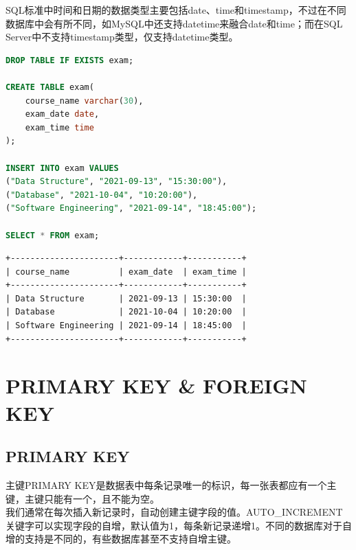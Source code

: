 \documentclass[12pt, openany, oneside]{book}
\begin{document}
SQL标准中时间和日期的数据类型主要包括date、time和timestamp，不过在不同数据库中会有所不同，如MySQL中还支持datetime来融合date和time；而在SQL Server中不支持timestamp类型，仅支持datetime类型。 \\


\begin{lstlisting}[language=SQL]
DROP TABLE IF EXISTS exam;

CREATE TABLE exam(
	course_name varchar(30),
	exam_date date,
	exam_time time
);

INSERT INTO exam VALUES
("Data Structure", "2021-09-13", "15:30:00"),
("Database", "2021-10-04", "10:20:00"),
("Software Engineering", "2021-09-14", "18:45:00");

SELECT * FROM exam;
\end{lstlisting}

\begin{tcolorbox}
    \begin{verbatim}
+----------------------+------------+-----------+
| course_name          | exam_date  | exam_time |
+----------------------+------------+-----------+
| Data Structure       | 2021-09-13 | 15:30:00  |
| Database             | 2021-10-04 | 10:20:00  |
| Software Engineering | 2021-09-14 | 18:45:00  |
+----------------------+------------+-----------+
	\end{verbatim}
\end{tcolorbox}

\newpage

\chapter{PRIMARY KEY \& FOREIGN KEY}

\section{PRIMARY KEY}

主键PRIMARY KEY是数据表中每条记录唯一的标识，每一张表都应有一个主键，主键只能有一个，且不能为空。 \\

我们通常在每次插入新记录时，自动创建主键字段的值。AUTO\_INCREMENT关键字可以实现字段的自增，默认值为1，每条新记录递增1。不同的数据库对于自增的支持是不同的，有些数据库甚至不支持自增主键。 \\

\end{document}
